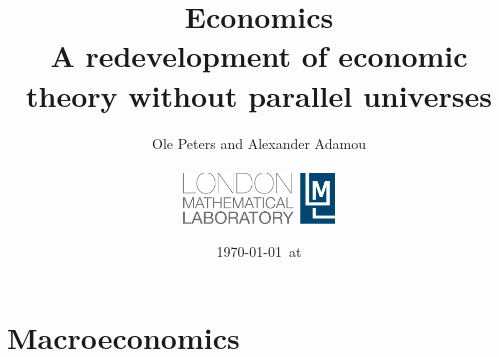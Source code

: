 


\title{Economics\\
\large{A redevelopment of economic theory without parallel universes}}
\author{Ole Peters and Alexander Adamou\\
\vspace{10cm}\\
\includegraphics[width=0.3\textwidth]{./lml_LOGO_whiteBG-eps-converted-to.pdf}}


\date{\today ~at \currenttime }

\maketitle

\tableofcontents
\newpage


%
%
%
%
\part{Macroeconomics}

%
%

\FloatBarrier
\printnoidxglossaries




